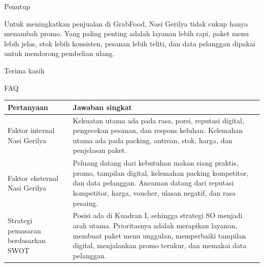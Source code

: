 \documentclass[aspectratio=169,11pt]{beamer}
\begin{document}
\begin{frame}{Penutup}
\centering
\vspace{0.25cm}
\begin{block}
\Large
Untuk meningkatkan penjualan di GrabFood, Nasi Gerilya tidak cukup hanya menambah promo. Yang paling penting adalah layanan lebih rapi, paket menu lebih jelas, stok lebih konsisten, pesanan lebih teliti, dan data pelanggan dipakai untuk mendorong pembelian ulang.
\end{block}
\vspace{0.5cm}
\Huge\textcolor{usuGreen}{Terima kasih}
\end{frame}

\begin{frame}{FAQ}
\small
\begin{tabularx}{\textwidth}{@{}L{0.34\textwidth}Y@{}}
\toprule
\textbf{Pertanyaan} & \textbf{Jawaban singkat} \\
\midrule
Faktor internal Nasi Gerilya & Kekuatan utama ada pada rasa, porsi, reputasi digital, pengecekan pesanan, dan respons keluhan. Kelemahan utama ada pada packing, antrean, stok, harga, dan penjelasan paket. \\
\addlinespace[0.18cm]
Faktor eksternal Nasi Gerilya & Peluang datang dari kebutuhan makan siang praktis, promo, tampilan digital, kelemahan packing kompetitor, dan data pelanggan. Ancaman datang dari reputasi kompetitor, harga, voucher, ulasan negatif, dan rasa pesaing. \\
\addlinespace[0.18cm]
Strategi pemasaran berdasarkan SWOT & Posisi ada di Kuadran I, sehingga strategi SO menjadi arah utama. Prioritasnya adalah merapikan layanan, membuat paket menu unggulan, memperbaiki tampilan digital, menjalankan promo terukur, dan memakai data pelanggan. \\
\bottomrule
\end{tabularx}
\end{frame}
\end{document}
